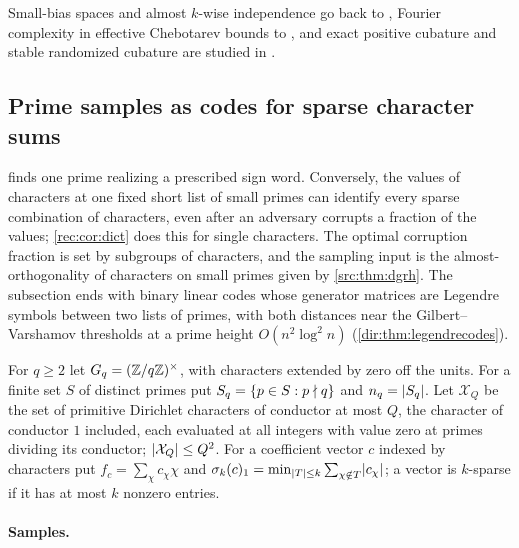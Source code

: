 Small-bias spaces and almost $k$-wise independence go back to \cite{NaorNaor1993SmallBias}, Fourier complexity in
effective Chebotarev bounds to \cite{Bellaiche2016Chebotarev}, and exact positive cubature and stable randomized
cubature are studied in \cite{Glaubitz2023Positive,MiglioratiNobile2022Stable}.

\subsection{Prime samples as codes for sparse character sums}\label{dir:sec:codes}

 finds one prime realizing a prescribed sign word. Conversely, the values of
characters at one fixed short list of small primes can identify every sparse combination of
characters, even after an adversary corrupts a fraction of the values; \cref{rec:cor:dict} does this
for single characters. The optimal corruption fraction is set by subgroups of characters, and the
sampling input is the almost-orthogonality of characters on small primes given by
\cref{src:thm:dgrh}. The subsection ends with binary linear codes whose generator matrices are
Legendre symbols between two lists of primes, with both distances near the Gilbert--Varshamov
thresholds at a prime height $O(n^2\log^2n)$ (\cref{dir:thm:legendrecodes}).

For $q\ge2$ let $G_q=(\mathbb{Z}/q\mathbb{Z})^\times$, with characters extended by zero off the units. For a finite set
$S$ of distinct primes put $S_q=\{p\in S:p\nmid q\}$ and $n_q=\lvert S_q\rvert$. Let $\mathcal X_Q$ be the set of
primitive Dirichlet characters of conductor at most $Q$, the character of conductor $1$ included, each
evaluated at all integers with value zero at primes dividing its conductor; $\lvert\mathcal X_Q\rvert\le Q^2$. For a
coefficient vector $c$ indexed by characters put $f_c=\sum_\chi c_\chi\chi$ and
$\sigma_k(c)_1=\min_{\lvert T\rvert\le k}\sum_{\chi\notin T}\lvert c_\chi\rvert$; a vector is $k$-sparse if it has at most $k$
nonzero entries.

\paragraph{Samples.}


